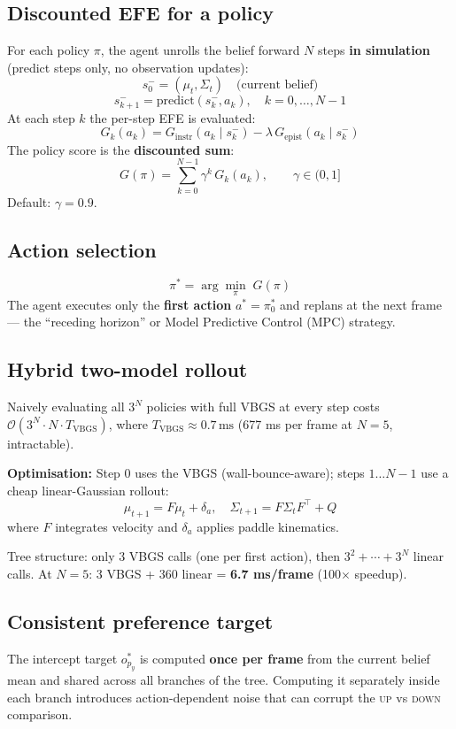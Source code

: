 \documentclass[12pt, a4paper]{article}
\newcommand{\1}{\mathbf{1}}
\begin{document}
\subsection{Discounted EFE for a policy}

For each policy $\pi$, the agent unrolls the belief forward $N$ steps
\textbf{in simulation} (predict steps only, no observation updates):
\[
s_0^- = (\mu_t, \Sigma_t) \quad \text{(current belief)}
\]
\[
s_{k+1}^- = \text{predict}(s_k^-, a_k), \quad k = 0, \ldots, N-1
\]
At each step $k$ the per-step EFE is evaluated:
\[
G_k(a_k) = G_\text{instr}(a_k \mid s_k^-) - \lambda\, G_\text{epist}(a_k \mid s_k^-)
\]
The policy score is the \textbf{discounted sum}:
\[
G(\pi) = \sum_{k=0}^{N-1} \gamma^k\, G_k(a_k), \qquad \gamma \in (0,1]
\]
Default: $\gamma = 0.9$.

\subsection{Action selection}

\[
\pi^* = \arg\min_\pi\; G(\pi)
\]
The agent executes only the \textbf{first action} $a^* = \pi^*_0$ and replans
at the next frame --- the ``receding horizon'' or Model Predictive Control (MPC)
strategy.

\subsection{Hybrid two-model rollout}

Naively evaluating all $3^N$ policies with full VBGS at every step costs
$\mathcal{O}(3^N \cdot N \cdot T_\text{VBGS})$, where
$T_\text{VBGS} \approx 0.7\,\text{ms}$ (677 ms per frame at $N=5$, intractable).

\textbf{Optimisation:} Step 0 uses the VBGS (wall-bounce-aware); steps
$1 \ldots N-1$ use a cheap linear-Gaussian rollout:
\[
\mu_{t+1} = F\mu_t + \delta_a,
\quad
\Sigma_{t+1} = F\Sigma_t F^\top + Q
\]
where $F$ integrates velocity and $\delta_a$ applies paddle kinematics.

Tree structure: only 3 VBGS calls (one per first action), then
$3^2 + \cdots + 3^N$ linear calls.  At $N=5$: 3 VBGS + 360 linear = \textbf{6.7
ms/frame} (100$\times$ speedup).

\subsection{Consistent preference target}

The intercept target $o^*_{p_y}$ is computed \textbf{once per frame} from the
current belief mean and shared across all branches of the tree.  Computing it
separately inside each branch introduces action-dependent noise that can corrupt
the \textsc{up} vs \textsc{down} comparison.
\end{document}
